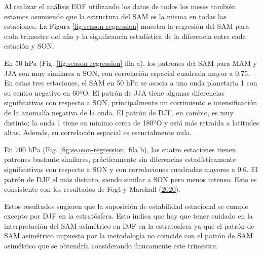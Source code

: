 \documentclass[12pt,oneside,a4paper]{reedthesis}
\begin{document}
Al realizar el análisis EOF utilizando los datos de todos los meses también estamos asumiendo que la estructura del SAM es la misma en todas las estaciones.
La Figura \ref{fig:season-regression} muestra la regresión del SAM para cada trimestre del año y la significancia estadística de la diferencia entre cada estación y SON.

En 50 hPa (Fig. \ref{fig:season-regression} fila a), los patrones del SAM para MAM y JJA son muy similares a SON, con correlación espacial cuadrada mayor a 0.75.
En estas tres estaciones, el SAM en 50 hPa se asocia a una onda planetaria 1 con su centro negativo en 60ºO.
El patrón de JJA tiene algunas diferencias significativas con respecto a SON, principalmente un corrimiento e intensificación de la anomalía negativa de la onda.
El patrón de DJF, en cambio, es muy distinto; la onda 1 tiene su mínimo cerca de 180ºO y está más retraída a latitudes altas.
Además, su correlación espacial es esencialmente nula.

En 700 hPa (Fig. \ref{fig:season-regression} fila b), las cuatro estaciones tienen patrones bastante similares, prácticamente sin diferencias estadísticamente significativas con respecto a SON y con correlaciones cuadradas mayores a 0.6.
El patrón de DJF el más distinto, siendo similar a SON pero menos intenso.
Esto es consistente con los resultados de Fogt y Marshall (\protect\hyperlink{ref-fogt2020}{2020}).

Estos resultados sugieren que la suposición de estabilidad estacional se cumple excepto por DJF en la estratósfera.
Esto indica que hay que tener cuidado en la interpretación del SAM asimétrico en DJF en la estratosfera ya que el patrón de SAM asimétrico impuesto por la metodología no coincide con el patrón de SAM asimétrico que se obtendría considerando únucamente este trimestre.
\end{document}
